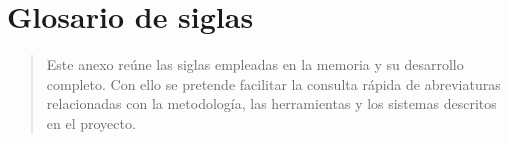 \chapter{Glosario de siglas}

\begin{abstract}
Este anexo reúne las siglas empleadas en la memoria y su desarrollo completo. Con ello se
pretende facilitar la consulta rápida de abreviaturas relacionadas con la metodología, las
herramientas y los sistemas descritos en el proyecto.
\end{abstract}

\printglossary[type=\acronymtype,title={Glosario de siglas},toctitle={Glosario de siglas}]
